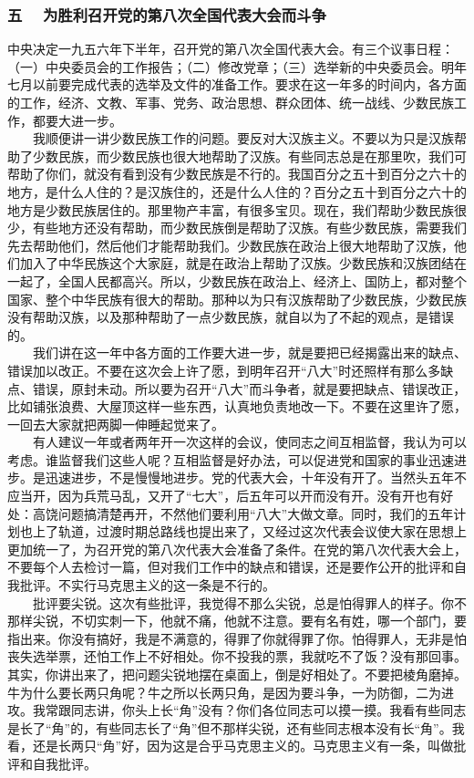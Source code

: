 \documentclass[cn,11pt,chinese]{elegantbook}
\def\myformat#1{\hfil\hfil #1}
\begin{document}
\subsubsection*{\myformat{五　  为胜利召开党的第八次全国代表大会而斗争}}
中央决定一九五六年下半年，召开党的第八次全国代表大会。有三个议事日程：（一）中央委员会的工作报告；（二）修改党章；（三）选举新的中央委员会。明年七月以前要完成代表的选举及文件的准备工作。要求在这一年多的时间内，各方面的工作，经济、文教、军事、党务、政治思想、群众团体、统一战线、少数民族工作，都要大进一步。\\
　　我顺便讲一讲少数民族工作的问题。要反对大汉族主义。不要以为只是汉族帮助了少数民族，而少数民族也很大地帮助了汉族。有些同志总是在那里吹，我们可帮助了你们，就没有看到没有少数民族是不行的。我国百分之五十到百分之六十的地方，是什么人住的？是汉族住的，还是什么人住的？百分之五十到百分之六十的地方是少数民族居住的。那里物产丰富，有很多宝贝。现在，我们帮助少数民族很少，有些地方还没有帮助，而少数民族倒是帮助了汉族。有些少数民族，需要我们先去帮助他们，然后他们才能帮助我们。少数民族在政治上很大地帮助了汉族，他们加入了中华民族这个大家庭，就是在政治上帮助了汉族。少数民族和汉族团结在一起了，全国人民都高兴。所以，少数民族在政治上、经济上、国防上，都对整个国家、整个中华民族有很大的帮助。那种以为只有汉族帮助了少数民族，少数民族没有帮助汉族，以及那种帮助了一点少数民族，就自以为了不起的观点，是错误的。\\
　　我们讲在这一年中各方面的工作要大进一步，就是要把已经揭露出来的缺点、错误加以改正。不要在这次会上许了愿，到明年召开“八大”时还照样有那么多缺点、错误，原封未动。所以要为召开“八大”而斗争者，就是要把缺点、错误改正，比如铺张浪费、大屋顶这样一些东西，认真地负责地改一下。不要在这里许了愿，一回去大家就把两脚一伸睡起觉来了。\\
　　有人建议一年或者两年开一次这样的会议，使同志之间互相监督，我认为可以考虑。谁监督我们这些人呢？互相监督是好办法，可以促进党和国家的事业迅速进步。是迅速进步，不是慢慢地进步。党的代表大会，十年没有开了。当然头五年不应当开，因为兵荒马乱，又开了“七大”，后五年可以开而没有开。没有开也有好处：高饶问题搞清楚再开，不然他们要利用“八大”大做文章。同时，我们的五年计划也上了轨道，过渡时期总路线也提出来了，又经过这次代表会议使大家在思想上更加统一了，为召开党的第八次代表大会准备了条件。在党的第八次代表大会上，不要每个人去检讨一篇，但对我们工作中的缺点和错误，还是要作公开的批评和自我批评。不实行马克思主义的这一条是不行的。\\
　　批评要尖锐。这次有些批评，我觉得不那么尖锐，总是怕得罪人的样子。你不那样尖锐，不切实刺一下，他就不痛，他就不注意。要有名有姓，哪一个部门，要指出来。你没有搞好，我是不满意的，得罪了你就得罪了你。怕得罪人，无非是怕丧失选举票，还怕工作上不好相处。你不投我的票，我就吃不了饭？没有那回事。其实，你讲出来了，把问题尖锐地摆在桌面上，倒是好相处了。不要把棱角磨掉。牛为什么要长两只角呢？牛之所以长两只角，是因为要斗争，一为防御，二为进攻。我常跟同志讲，你头上长“角”没有？你们各位同志可以摸一摸。我看有些同志是长了“角”的，有些同志长了“角”但不那样尖锐，还有些同志根本没有长“角”。我看，还是长两只“角”好，因为这是合乎马克思主义的。马克思主义有一条，叫做批评和自我批评。\\
\end{document}
